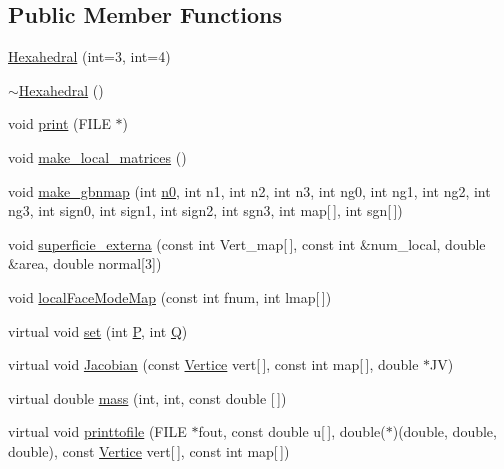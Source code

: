 \subsection*{Public Member Functions}
\begin{DoxyCompactItemize}
\item 
\hyperlink{classHexahedral_accce80b563e28b4f372419b510c5f122}{Hexahedral} (int=3, int=4)
\item 
\hyperlink{classHexahedral_a5dd55bffa5429ce058c3a4db675a55ac}{$\sim$\+Hexahedral} ()
\item 
void \hyperlink{classHexahedral_af30ff09b60c553acabb51c5aa27d8d22}{print} (F\+I\+LE $\ast$)
\item 
void \hyperlink{classHexahedral_a0090804316dd33890d611b294cc2df91}{make\+\_\+local\+\_\+matrices} ()
\item 
void \hyperlink{classHexahedral_a2bf67c9399982ead12bd08efaf90dc3c}{make\+\_\+gbnmap} (int \hyperlink{DG__EI__Header_8h_a5f7b79d1f60dd1c85e99108c66052098}{n0}, int n1, int n2, int n3, int ng0, int ng1, int ng2, int ng3, int sign0, int sign1, int sign2, int sgn3, int map\mbox{[}$\,$\mbox{]}, int sgn\mbox{[}$\,$\mbox{]})
\item 
void \hyperlink{classHexahedral_a6debdf2dd1221b9e039b29cae8a4e517}{superficie\+\_\+externa} (const int Vert\+\_\+map\mbox{[}$\,$\mbox{]}, const int \&num\+\_\+local, double \&area, double normal\mbox{[}3\mbox{]})
\item 
void \hyperlink{classHexahedral_a9692307cd160489de6e8467863938dae}{local\+Face\+Mode\+Map} (const int fnum, int lmap\mbox{[}$\,$\mbox{]})
\item 
virtual void \hyperlink{classHexahedral_aed81c3a2149b36e9bdc0dd67bc5f3bdc}{set} (int \hyperlink{classStdel_a05cbb3f2a3fa0bc04a74e347dc6574cf}{P}, int \hyperlink{classStdel_a82074e598ad5af5ec45a3257a3c2b684}{Q})
\item 
virtual void \hyperlink{classHexahedral_aa12d6d2abce9f0c7f6065e907be71201}{Jacobian} (const \hyperlink{structVertice}{Vertice} vert\mbox{[}$\,$\mbox{]}, const int map\mbox{[}$\,$\mbox{]}, double $\ast$JV)
\item 
virtual double \hyperlink{classHexahedral_a8a25a3772962f7cb6d2f8c6b6871c0d1}{mass} (int, int, const double \mbox{[}$\,$\mbox{]})
\item 
virtual void \hyperlink{classHexahedral_a062fb995d31193f800fbf12ff7f19571}{printtofile} (F\+I\+LE $\ast$fout, const double u\mbox{[}$\,$\mbox{]}, double($\ast$)(double, double, double), const \hyperlink{structVertice}{Vertice} vert\mbox{[}$\,$\mbox{]}, const int map\mbox{[}$\,$\mbox{]})

\end{DoxyCompactItemize}
